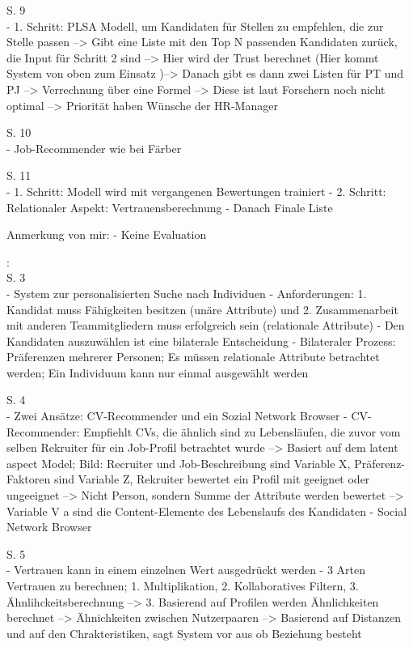 S. 9\\
- 1. Schritt: PLSA Modell, um Kandidaten für Stellen zu empfehlen, die zur Stelle passen --> Gibt eine Liste mit den Top N passenden Kandidaten zurück, die Input für Schritt 2 sind --> Hier wird der Trust berechnet (Hier kommt System von oben zum Einsatz )--> Danach gibt es dann zwei Listen für PT und PJ --> Verrechnung über eine Formel --> Diese ist laut Forschern noch nicht optimal --> Priorität haben Wünsche der HR-Manager

S. 10\\
- Job-Recommender wie bei Färber

S. 11\\
- 1. Schritt: Modell wird mit vergangenen Bewertungen trainiert
- 2. Schritt: Relationaler Aspekt: Vertrauensberechnung
- Danach Finale Liste

Anmerkung von mir:
- Keine Evaluation

\textcite{keim:2005}:\\
S. 3\\
- System zur personalisierten Suche nach Individuen
- Anforderungen: 1. Kandidat muss Fähigkeiten besitzen (unäre Attribute) und 2. Zusammenarbeit mit anderen Teammitgliedern muss erfolgreich sein (relationale Attribute)
- Den Kandidaten auszuwählen ist eine bilaterale Entscheidung
- Bilateraler Prozess: Präferenzen mehrerer Personen; Es müssen relationale Attribute betrachtet werden; Ein Individuum kann nur einmal ausgewählt werden

S. 4\\
- Zwei Ansätze: CV-Recommender und ein Sozial Network Browser
- CV-Recommender: Empfiehlt CVs, die ähnlich sind zu Lebensläufen, die zuvor vom selben Rekruiter für ein Job-Profil betrachtet wurde --> Basiert auf dem latent aspect Model; Bild: Recruiter und Job-Beschreibung sind Variable X, Präferenz-Faktoren sind Variable Z, Rekruiter bewertet ein Profil mit geeignet oder ungeeignet --> Nicht Person, sondern Summe der Attribute werden bewertet --> Variable V a sind die Content-Elemente des Lebenslaufs des Kandidaten
- Social Network Browser

S. 5\\
- Vertrauen kann in einem einzelnen Wert ausgedrückt werden
- 3 Arten Vertrauen zu berechnen; 1. Multiplikation, 2. Kollaboratives Filtern, 3. Ähnlihckeitsberechnung --> 3. Basierend auf Profilen werden Ähnlichkeiten berechnet --> Ähnichkeiten zwischen Nutzerpaaren --> Basierend auf Distanzen und auf den Chrakteristiken, sagt System vor aus ob Beziehung besteht

